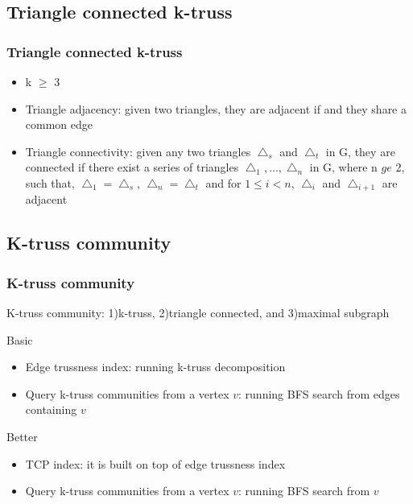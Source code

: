 \documentclass{beamer}
\begin{document}
\subsection{Triangle connected k-truss}
\begin{frame}
\frametitle{Triangle connected k-truss}
\begin{itemize}
\item k $\ge$ 3 
\item Triangle adjacency: given two triangles, they are adjacent if and they share a common edge
\item Triangle connectivity: given any two triangles $\bigtriangleup_{s}$ and $\bigtriangleup_{t}$ in G, they are connected if there exist a series of triangles $\bigtriangleup_{1},...,\bigtriangleup_{n}$ in G, where n $ge$ 2, such that, $\bigtriangleup_{1} = \bigtriangleup_{s}$, $\bigtriangleup_{n}=\bigtriangleup_{t}$ and for $1\le i< n $, $\bigtriangleup_{i}$ and $\bigtriangleup_{i+1}$ are adjacent 
\end{itemize}
\end{frame}

\subsection{K-truss community}
\begin{frame}
\frametitle{K-truss community}
\begin{definition}
K-truss community: 1)k-truss, 2)triangle connected, and 3)maximal subgraph
\end{definition}
Basic
\begin{itemize}
\item Edge trussness index: running k-truss decomposition
\item Query k-truss communities from a vertex $v$: running BFS search from edges containing $v$
\end{itemize}
Better
\begin{itemize}
\item TCP index: it is built on top of edge trussness index
\item Query k-truss communities from a vertex $v$: running BFS search from $v$
\end{itemize}
\end{frame}

\end{document}
